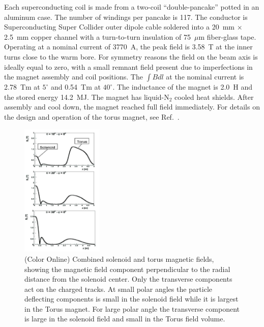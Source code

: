 \documentclass[final,3p,twocolumn]{elsarticle}
\begin{document}
Each superconducting coil is made from a two-coil ``double-pancake'' potted in an aluminum case. The number of
windings per pancake is 117. The conductor is Superconducting Super Collider outer dipole cable soldered into 
a 20~mm $\times$ 2.5~mm
copper channel with a turn-to-turn insulation of 75~$\mu$m fiber-glass tape. Operating at a nominal current of
3770~A, the peak field is 3.58~T at the inner turns close to the warm bore. For symmetry reasons the field on
the beam axis is ideally equal to zero, with a small remnant field present due to imperfections in the magnet
assembly and coil positions. The $\int {Bdl}$ at the nominal current is 2.78~Tm at $5^\circ$ and 0.54~Tm at
$40^\circ$. The inductance of the magnet is 2.0~H and the stored energy 14.2~MJ. The magnet has liquid-N$_2$
cooled heat shields. After assembly and cool down, the magnet reached full field immediately. For details on the
design and operation of the torus magnet, see Ref.~\cite{clas12-magnets}.
\begin{figure}[htbp!]
\centerline{\includegraphics[width=0.35\textwidth,height=0.35\textheight]{magfield.png}}
\caption{(Color Online) Combined solenoid and torus magnetic fields, showing the magnetic field component perpendicular 
to the radial distance from the solenoid center. Only
  the transverse components act on the charged tracks. At small polar angles the particle deflecting components is small
  in the solenoid field while it is largest in the Torus magnet. For large polar angle the transverse component is large in 
  the solenoid field and small in the Torus field volume. } 
\label{solenoid-torus}
\end{figure}
\end{document}
